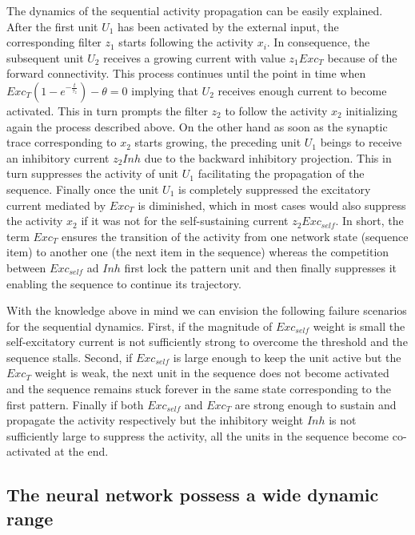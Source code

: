 \documentclass[a4paper]{esannV2}
\begin{document}
The dynamics of the sequential activity propagation can be easily explained. After the first unit $U_1$ has been activated by the external input, the corresponding filter $z_1$ starts following the activity $x_i$. In consequence, the subsequent unit $U_2$ receives a growing current with value $z_1 Exc_T$ because of the forward connectivity. This process continues until the point in time when $Exc_{T}(1 - e^{-\frac{t}{\tau_z}}) - \theta = 0$ implying that $U_2$ receives enough current to become activated. This in turn prompts the filter $z_2$ to follow the activity $x_2$ initializing again the process described above. On the other hand as soon as the synaptic trace corresponding to $x_2$ starts growing, the preceding unit $U_1$ beings to receive an inhibitory current $z_2 Inh$ due to the backward inhibitory projection. This in turn suppresses the activity of unit $U_1$ facilitating the propagation of the sequence. Finally once the unit $U_1$ is completely suppressed the excitatory current mediated by $Exc_T$ is diminished, which in most cases would also suppress the activity $x_2$ if it was not for the self-sustaining current $z_2 Exc_{self}$. In short, the term $Exc_T$ ensures the transition of the activity from one network state (sequence item) to another one (the next item in the sequence) whereas the competition between $Exc_{self}$ ad $Inh$ first lock the pattern unit and then finally suppresses it enabling the sequence to continue its trajectory. 


With the knowledge above in mind we can envision the following  failure scenarios for the sequential dynamics. First, if the magnitude of $Exc_{self}$ weight is small the self-excitatory current is not sufficiently strong to overcome the threshold and the sequence stalls. Second, if $Exc_{self}$ is large enough to keep the unit active but the $Exc_{T}$ weight is weak, the next unit in the sequence does not become activated and the sequence remains stuck forever in the same state corresponding to the first pattern. Finally if both $Exc_{self}$ and $Exc_T$ are strong enough to sustain and propagate the activity respectively but the inhibitory weight $Inh$ is not sufficiently large to suppress the activity, all the units in the sequence become co-activated at the end. 

\subsection{The neural network possess a wide dynamic range}
\end{document}
